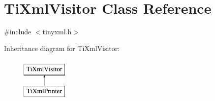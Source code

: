 \hypertarget{classTiXmlVisitor}{\section{\-Ti\-Xml\-Visitor \-Class \-Reference}
\label{classTiXmlVisitor}
}


{\ttfamily \#include $<$tinyxml.\-h$>$}

\-Inheritance diagram for \-Ti\-Xml\-Visitor\-:\begin{figure}[H]
\begin{center}
\leavevmode
\includegraphics[height=2.000000cm]{classTiXmlVisitor}
\end{center}
\end{figure}
